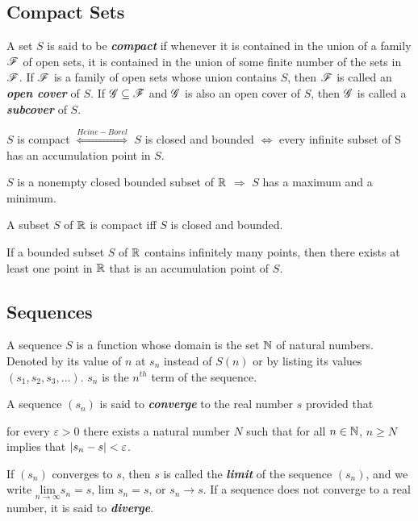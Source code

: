 \documentclass[12pt]{article}
\begin{document}
\subsection{Compact Sets}
\label{sec:org82b3fa3}
\begin{definition}
  A set $S$ is said to be \textit{\textbf{compact}} if whenever it is
  contained in the union of a family $\mathscr{F}$ of open sets, it is contained in
  the union of some finite number of the sets in $\mathscr{F}$. If $\mathscr{F}$ is a family of
  open sets whose union contains $S$, then $\mathscr{F}$ is called an
  \textit{\textbf{open cover}} of $S$. If $\mathscr{G} \subseteq \mathscr{F}$ and $\mathscr{G}$ is also an open
  cover of $S$, then $\mathscr{G}$ is called a \textit{\textbf{subcover}} of $S$.

  \begin{corollary}
      $S$ is compact $\overset{Heine-Borel}{\iff}$ $S$ is closed and bounded
      $\iff$ every infinite subset of S has an accumulation point in $S$.

      $S$ is a nonempty closed bounded subset of $\mathbb{R}$ $\Rightarrow$ $S$ has a maximum
      and a minimum.
  \end{corollary}
\end{definition}

\begin{definition}
  A subset $S$ of $\mathbb{R}$ is compact iff $S$ is closed and bounded.
\end{definition}

\begin{definition}
  If a bounded subset $S$ of $\mathbb{R}$ contains infinitely many points, then there
  exists at least one point in $\mathbb{R}$ that is an accumulation point of $S$.
\end{definition}

\subsection{Sequences}
\label{sec:org69964c4}
\begin{definition}[Sequence]
  A sequence $S$ is a function whose domain is the set $\mathbb{N}$ of natural
  numbers. Denoted by its value of $n$ at $s_n$ instead of $S(n)$ or by listing
  its values $(s_1, s_2, s_3, ...)$. $s_n$ is the $n^{th}$ term of the sequence.
\end{definition}

\begin{definition}
  A sequence $(s_n)$ is said to \textbf{\textit{converge}} to the real number
  $s$ provided that
  \begin{center}
    for every $\varepsilon > 0$ there exists a natural number $N$ such that for
    all $n \in \mathbb{N}$, $n \ge N$ implies that $\left|s_n - s\right| < \varepsilon$.
  \end{center}
  If $(s_n)$ converges to $s$, then $s$ is called the \textbf{\textit{limit}}
  of the sequence $(s_n)$, and we write $\underset{n\rightarrow\infty}{\text{lim}} s_n = s$,
  lim $s_n = s$, or $s_n \rightarrow s$. If a sequence does not converge to a real
  number, it is said to \textbf{\textit{diverge}}.
\end{definition}
\end{document}
